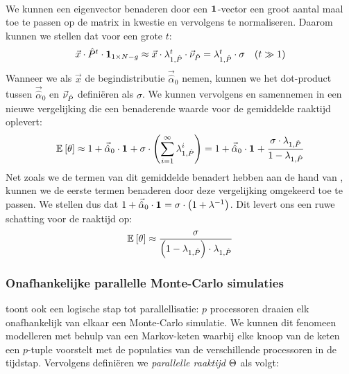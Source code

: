 \paragraph{}
We kunnen een eigenvector benaderen door een $\onematrix$-vector een groot aantal maal toe te passen op de matrix in kwestie en vervolgens te normaliseren. Daarom kunnen we stellen dat voor een grote $t$:
\begin{equation}
\begin{array}{cc}
\vec{x}\cdot\hat{P}^t\cdot\onematrix[1\times N-g]\approx\vec{x}\cdot\ev[1,\hat{P}]^t\cdot\evr[\hat{P}]=\ev[1,\hat{P}]^t\cdot\sigma&\mbox{($t\gg 1$)}
\end{array}
\eqnlab{longTermAlpha}
\end{equation}
Wanneer we als $\vec{x}$ de begindistributie $\vec{\hat{\alpha}}_0$ nemen, kunnen we het dot-product tussen $\vec{\hat{\alpha}}_0$ en $\evr[\hat{P}]$ defini\"eren als $\sigma$. We kunnen vervolgens  en  samennemen in een nieuwe vergelijking die
een benaderende waarde voor de gemiddelde raaktijd oplevert:
\begin{equation}
\mean{\theta}\approx 1+\vec{\hat{\alpha}}_0\cdot\onematrix+\sigma\cdot\brak{\displaystyle\sum_{i=1}^{\infty}\lambda_{1,\hat{P}}^i}=1+\vec{\hat{\alpha}}_0\cdot\onematrix+\displaystyle\frac{\sigma\cdot \lambda_{1,\hat{P}}}{1-\lambda_{1,\hat{P}}}
\end{equation}
Net zoals we de termen van dit gemiddelde benadert hebben aan de hand van , kunnen we de eerste termen benaderen door deze vergelijking omgekeerd toe te passen. We stellen dus dat $1+\vec{\hat{\alpha}}_0\cdot\onematrix=\sigma\cdot\brak{1+\lambda^{-1}}$. Dit levert ons een ruwe schatting voor de raaktijd op:
\begin{equation}
\mean{\hittime}\approx\displaystyle\frac{\sigma}{\brak{1-\lambda_{1,\hat{P}}}\cdot\lambda_{1,\hat{P}}}
\eqnlab{hitTimeSingle}
\end{equation}

\subsubsection{Onafhankelijke parallelle Monte-Carlo simulaties}

\cite{DBLP:journals/jc/ShonkwilerV94} toont ook een logische stap tot parallellisatie: $p$ processoren draaien elk onafhankelijk van elkaar een Monte-Carlo simulatie. We kunnen dit fenomeen modelleren met behulp van een Markov-keten waarbij elke knoop van de keten een $p$-tuple voorstelt met de populaties van de verschillende processoren in de tijdstap. Vervolgens defini\"eren we \emph{parallelle raaktijd} $\phittime$ als volgt:

